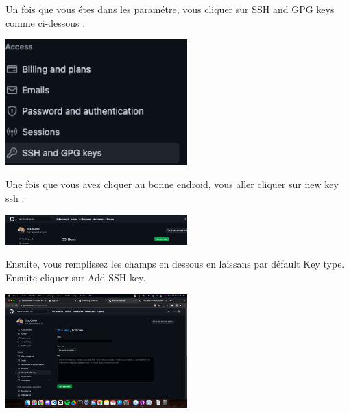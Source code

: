 \documentclass[12pt]{article}
\begin{document}
\vspace{0.3cm}

Un fois que vous étes dans les paramétre, vous cliquer sur SSH and GPG keys comme ci-dessous : 

\vspace{0.3cm}

\begin{center}
  \includegraphics[width=7cm]{Image-TD-Git-5/ssh-gpg.png}
\end{center}

Une fois que vous avez cliquer au bonne endroid, vous aller cliquer sur new key ssh : 

\vspace{0.3cm}

\begin{center}
  \includegraphics[width=7cm]{Image-TD-Git-5/new-ssh-key.png}
\end{center}

\vspace{0.3cm}

Ensuite, vous remplissez les champs en dessous en laissans par défault Key type. Ensuite cliquer sur Add SSH key.

\vspace{0.3cm}

\begin{center}
  \includegraphics[width=7cm]{Image-TD-Git-5/ssh-key.png}
\end{center}
\end{document}
